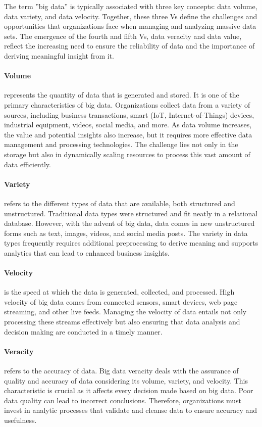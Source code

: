 The term ''big data'' is typically associated with three key concepts: data volume, data variety, and data velocity. Together, these three Vs define the challenges and opportunities that organizations face when managing and analyzing massive data sets. The emergence of the fourth and fifth Vs, data veracity and data value, reflect the increasing need to ensure the reliability of data and the importance of deriving meaningful insight from it.

\paragraph*{Volume} represents the quantity of data that is generated and stored. It is one of the primary characteristics of big data. Organizations collect data from a variety of sources, including business transactions, smart (IoT, Internet-of-Things) devices, industrial equipment, videos, social media, and more. As data volume increases, the value and potential insights also increase, but it requires more effective data management and processing technologies. The challenge lies not only in the storage but also in dynamically scaling resources to process this vast amount of data efficiently.

\paragraph*{Variety} refers to the different types of data that are available, both structured and unstructured. Traditional data types were structured and fit neatly in a relational database. However, with the advent of big data, data comes in new unstructured forms such as text, images, videos, and social media posts. The variety in data types frequently requires additional preprocessing to derive meaning and supports analytics that can lead to enhanced business insights.

\paragraph*{Velocity} is the speed at which the data is generated, collected, and processed. High velocity of big data comes from connected sensors, smart devices, web page streaming, and other live feeds. Managing the velocity of data entails not only processing these streams effectively but also ensuring that data analysis and decision making are conducted in a timely manner.

\paragraph*{Veracity} refers to the accuracy of data. Big data veracity deals with the assurance of quality and accuracy of data considering its volume, variety, and velocity. This characteristic is crucial as it affects every decision made based on big data. Poor data quality can lead to incorrect conclusions. Therefore, organizations must invest in analytic processes that validate and cleanse data to ensure accuracy and usefulness.

